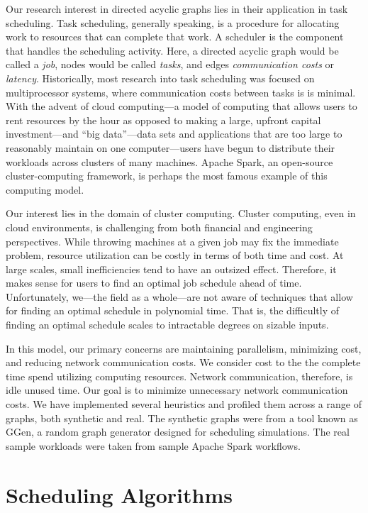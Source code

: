 \documentclass[11pt, oneside]{article}   	%
\begin{document}
Our research interest in directed acyclic graphs lies in their application in task scheduling.  Task scheduling, generally speaking, is a procedure for allocating work to resources that can complete that work. A scheduler is the component that handles the scheduling activity. Here, a directed acyclic graph would be called a \emph{job}, nodes would be called \emph{tasks}, and edges \emph{communication costs} or \emph{latency}. Historically, most research into task scheduling was focused on multiprocessor systems, where communication costs between tasks is is minimal. With the advent of cloud computing---a model of computing that allows users to rent resources by the hour as opposed to making a large, upfront capital investment---and ``big data''---data sets and applications that are too large to reasonably maintain on one computer---users have begun to distribute their workloads across clusters of many machines. Apache Spark, an open-source cluster-computing framework, is perhaps the most famous example of this computing model. 

Our interest lies in the domain of cluster computing. Cluster computing, even in cloud environments, is challenging from both financial and engineering perspectives. While throwing machines at a given job may fix the immediate problem, resource utilization can be costly in terms of both time and cost. At large scales, small inefficiencies tend to have an outsized effect. Therefore, it makes sense for users to find an optimal job schedule ahead of time. Unfortunately, we---the field as a whole---are not aware of techniques that allow for finding an optimal schedule in polynomial time. That is, the difficultly of finding an optimal schedule scales to intractable degrees on sizable inputs.

In this model, our primary concerns are maintaining parallelism, minimizing cost, and reducing network communication costs. We consider cost to the the complete time spend utilizing computing resources. Network communication, therefore, is idle unused time. Our goal is to minimize unnecessary network communication costs. We have implemented several heuristics and profiled them across a range of graphs, both synthetic and real. The synthetic graphs were from a tool known as GGen, a random graph generator designed for scheduling simulations. The real sample workloads were taken from sample Apache Spark workflows.

\section{Scheduling Algorithms}
\end{document}
